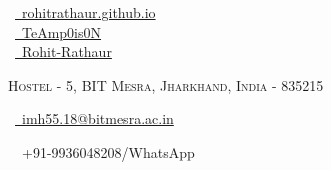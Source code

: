 \documentclass[a4paper,10pt]{extarticle} %
\begin{document}
\pagestyle{empty} %


\begin{multicols}{3}
\normalsize  \faGlobe\ {\href{https://teamp0is0n.github.io/rohit-rathaur.github.io/}{\ rohitrathaur.github.io}}\\
\normalsize \faGithub\ {\href{https://github.com/TeAmp0is0N}{\  TeAmp0is0N}}\\
\normalsize  \faLinkedinSquare\ {\href{https://www.linkedin.com/in/rohit-singh-rathaur/}{\  Rohit-Rathaur}}\\
\columnbreak
\normalsize\par{\centering{\huge\textsc{\textcolor{primary}{Rohit Singh Rathaur}}}\par} %
\par{\centering\normalsize {\textsc{Hostel - 5, BIT Mesra, Jharkhand, India - 835215}}\hfill\par}
\columnbreak
\raggedright\hfill\normalsize \faEnvelope\ {\href{mailto:imh55.18@bitmesra.ac.in}{\  imh55.18@bitmesra.ac.in}}\\
\raggedright\hfill{\faPhone\ \  +91-9936048208/WhatsApp}
\end{multicols}
\vspace{-0.4 cm}

\end{document}
